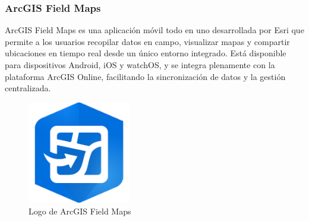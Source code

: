 \documentclass{article}
\begin{document}
\subsubsection{ArcGIS Field Maps}

ArcGIS Field Maps \cite{esriFieldMaps} es una aplicación móvil todo en uno desarrollada por Esri que permite a los usuarios recopilar datos en campo, visualizar mapas y compartir ubicaciones en tiempo real desde un único entorno integrado. Está disponible para dispositivos Android, iOS y watchOS, y se integra plenamente con la plataforma ArcGIS Online, facilitando la sincronización de datos y la gestión centralizada.

\begin{figure}[h]
  \centering
  \includegraphics[width=0.4\textwidth]{images/arcgis_logo.png}
  \caption{Logo de ArcGIS Field Maps}
  \label{fig:arcgisfieldmapslogo}
\end{figure}
\end{document}
